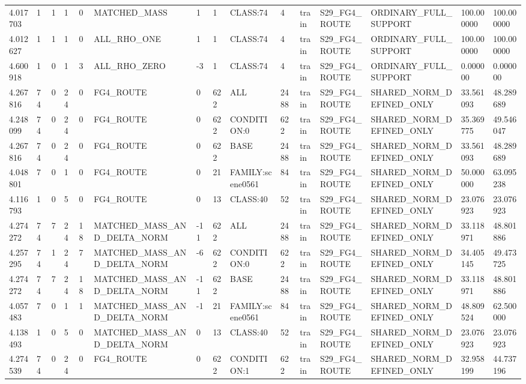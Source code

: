 \begin{tabular}{lllllllllllllll}
4.017703 & 1 & 1 & 1 & 0 & MATCHED\_MASS & 1 & 1 & CLASS:74 & 4 & train & S29\_FG4\_ROUTE & ORDINARY\_FULL\_SUPPORT & 100.000000 & 100.000000 \\
4.012627 & 1 & 1 & 1 & 0 & ALL\_RHO\_ONE & 1 & 1 & CLASS:74 & 4 & train & S29\_FG4\_ROUTE & ORDINARY\_FULL\_SUPPORT & 100.000000 & 100.000000 \\
4.600918 & 1 & 0 & 1 & 3 & ALL\_RHO\_ZERO & -3 & 1 & CLASS:74 & 4 & train & S29\_FG4\_ROUTE & ORDINARY\_FULL\_SUPPORT & 0.000000 & 0.000000 \\
4.267816 & 74 & 0 & 24 & 0 & FG4\_ROUTE & 0 & 622 & ALL & 2488 & train & S29\_FG4\_ROUTE & SHARED\_NORM\_DEFINED\_ONLY & 33.561093 & 48.289689 \\
4.248099 & 74 & 0 & 24 & 0 & FG4\_ROUTE & 0 & 622 & CONDITION:0 & 622 & train & S29\_FG4\_ROUTE & SHARED\_NORM\_DEFINED\_ONLY & 35.369775 & 49.546047 \\
4.267816 & 74 & 0 & 24 & 0 & FG4\_ROUTE & 0 & 622 & BASE & 2488 & train & S29\_FG4\_ROUTE & SHARED\_NORM\_DEFINED\_ONLY & 33.561093 & 48.289689 \\
4.048801 & 7 & 0 & 1 & 0 & FG4\_ROUTE & 0 & 21 & FAMILY:scene0561 & 84 & train & S29\_FG4\_ROUTE & SHARED\_NORM\_DEFINED\_ONLY & 50.000000 & 63.095238 \\
4.116793 & 1 & 0 & 5 & 0 & FG4\_ROUTE & 0 & 13 & CLASS:40 & 52 & train & S29\_FG4\_ROUTE & SHARED\_NORM\_DEFINED\_ONLY & 23.076923 & 23.076923 \\
4.274272 & 74 & 7 & 24 & 18 & MATCHED\_MASS\_AND\_DELTA\_NORM & -11 & 622 & ALL & 2488 & train & S29\_FG4\_ROUTE & SHARED\_NORM\_DEFINED\_ONLY & 33.118971 & 48.801886 \\
4.257295 & 74 & 1 & 24 & 7 & MATCHED\_MASS\_AND\_DELTA\_NORM & -6 & 622 & CONDITION:0 & 622 & train & S29\_FG4\_ROUTE & SHARED\_NORM\_DEFINED\_ONLY & 34.405145 & 49.473725 \\
4.274272 & 74 & 7 & 24 & 18 & MATCHED\_MASS\_AND\_DELTA\_NORM & -11 & 622 & BASE & 2488 & train & S29\_FG4\_ROUTE & SHARED\_NORM\_DEFINED\_ONLY & 33.118971 & 48.801886 \\
4.057483 & 7 & 0 & 1 & 1 & MATCHED\_MASS\_AND\_DELTA\_NORM & -1 & 21 & FAMILY:scene0561 & 84 & train & S29\_FG4\_ROUTE & SHARED\_NORM\_DEFINED\_ONLY & 48.809524 & 62.500000 \\
4.138493 & 1 & 0 & 5 & 0 & MATCHED\_MASS\_AND\_DELTA\_NORM & 0 & 13 & CLASS:40 & 52 & train & S29\_FG4\_ROUTE & SHARED\_NORM\_DEFINED\_ONLY & 23.076923 & 23.076923 \\
4.274539 & 74 & 0 & 24 & 0 & FG4\_ROUTE & 0 & 622 & CONDITION:1 & 622 & train & S29\_FG4\_ROUTE & SHARED\_NORM\_DEFINED\_ONLY & 32.958199 & 44.737196 \\

\end{tabular}
